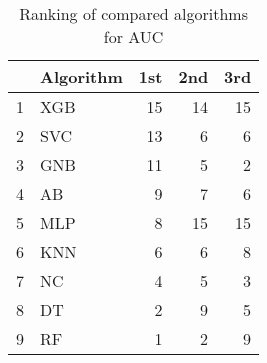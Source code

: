 \begin{table}
\footnotesize
\caption{Ranking of compared algorithms for AUC}
\label{tab:places AUC}
\begin{tabular}{llrrr}
\hline
 & Algorithm & 1st & 2nd & 3rd \\
\hline
1 & XGB & 15 & 14 & 15 \\
2 & SVC & 13 & 6 & 6 \\
3 & GNB & 11 & 5 & 2 \\
4 & AB & 9 & 7 & 6 \\
5 & MLP & 8 & 15 & 15 \\
6 & KNN & 6 & 6 & 8 \\
7 & NC & 4 & 5 & 3 \\
8 & DT & 2 & 9 & 5 \\
9 & RF & 1 & 2 & 9 \\
\hline
\end{tabular}
\end{table}

